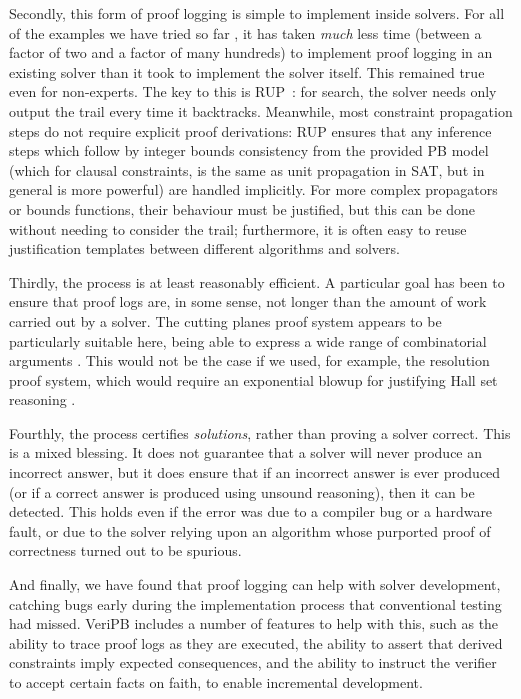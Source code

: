 \documentclass[runningheads]{llncs}
\begin{document}
Secondly, this form of proof logging is simple to implement inside solvers. For all of the examples
we have tried so far \cite{DBLP:conf/aaai/ElffersGMN20,GochtMMNPT20,DBLP:conf/ijcai/GochtMN20}, it
has taken \emph{much} less time (between a factor of two and a factor of many hundreds) to implement
proof logging in an existing solver than it took to implement the solver itself. This remained true
even for non-experts. The key to this is RUP~\cite{DBLP:conf/aaai/ElffersGMN20}: for
search, the solver needs only output the trail
every time it backtracks. Meanwhile, most constraint propagation steps do not require explicit proof
derivations: RUP ensures that any inference steps which follow by integer bounds consistency
\cite{DBLP:conf/ausai/ChoiHLS06} from the provided PB model (which for clausal constraints, is the
same as unit propagation in SAT, but in general is more powerful) are handled implicitly. For more
complex propagators or bounds functions, their behaviour must be justified, but this can be done
without needing to consider the trail; furthermore, it is often easy to reuse justification
templates between different algorithms and solvers.

Thirdly, the process is at least reasonably efficient. A particular goal has been to ensure that
proof logs are, in some sense, not longer than the amount of work carried out by a solver. The
cutting planes proof system appears to be particularly suitable here, being able to express a wide
range of combinatorial arguments
\cite{DBLP:conf/aaai/ElffersGMN20,GochtMMNPT20,DBLP:conf/ijcai/GochtMN20}. This would not be the
case if we used, for example, the resolution proof system, which would require an exponential blowup
for justifying Hall set reasoning \cite{DBLP:journals/tcs/Haken85,Stuckey19}.

Fourthly, the process certifies \emph{solutions}, rather than proving a solver correct. This is a
mixed blessing. It does not guarantee that a solver will never produce an incorrect answer, but it
does ensure that if an incorrect answer is ever produced (or if a correct answer is produced using
unsound reasoning), then it can be detected. This holds even if the error was due to a compiler bug
or a hardware fault, or due to the solver relying upon an algorithm whose purported proof of
correctness turned out to be spurious.

And finally, we have found that proof logging can help with solver development, catching bugs early
during the implementation process that conventional testing had missed. VeriPB includes a number of
features to help with this, such as the ability to trace proof logs as they are executed, the
ability to assert that derived constraints imply expected consequences, and the ability
to instruct the verifier to accept certain facts on faith, to enable incremental
development.



\end{document}
